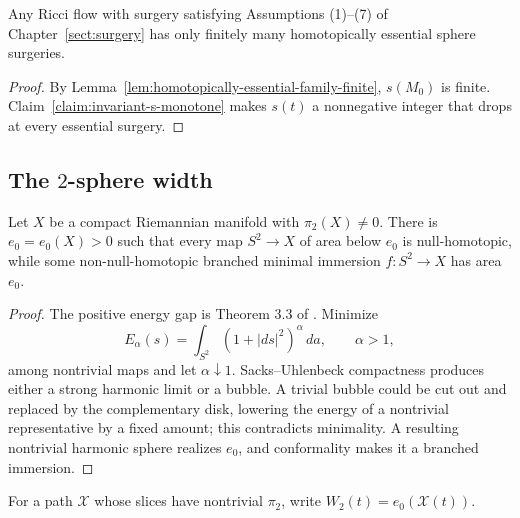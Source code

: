 \begin{proposition}
\label{prop:finitely-many-homotopically-essential-surgeries}
\label{homess}
Any Ricci flow with surgery satisfying Assumptions (1)--(7) of
Chapter~\ref{sect:surgery} has only finitely many homotopically essential
sphere surgeries.
\end{proposition}
\begin{proof}
\sketch By Lemma~\ref{lem:homotopically-essential-family-finite}, $s(M_0)$ is
finite. Claim~\ref{claim:invariant-s-monotone} makes $s(t)$ a nonnegative
integer that drops at every essential surgery.
\end{proof}

\subsection{The $2$-sphere width}

\begin{lemma}
\label{lem:minimal-sphere-energy-gap}
Let $X$ be a compact Riemannian manifold with $\pi_2(X)\ne0$. There is
$e_0=e_0(X)>0$ such that every map $S^2\to X$ of area below $e_0$ is
null-homotopic, while some non-null-homotopic branched minimal immersion
$f\colon S^2\to X$ has area $e_0$.
\end{lemma}
\begin{proof}
\sketch The positive energy gap is Theorem 3.3 of \cite{SacksUhlenbeck}.
Minimize
\[
E_\alpha(s)=\int_{S^2}(1+|ds|^2)^\alpha\,da,
\qquad \alpha>1,
\]
among nontrivial maps and let $\alpha\downarrow1$. Sacks--Uhlenbeck
compactness produces either a strong harmonic limit or a bubble. A trivial
bubble could be cut out and replaced by the complementary disk, lowering the
energy of a nontrivial representative by a fixed amount; this contradicts
minimality. A resulting nontrivial harmonic sphere realizes $e_0$, and
conformality makes it a branched immersion.
\end{proof}

For a path ${\mathcal X}$ whose slices have nontrivial $\pi_2$, write
$W_2(t)=e_0({\mathcal X}(t))$.

